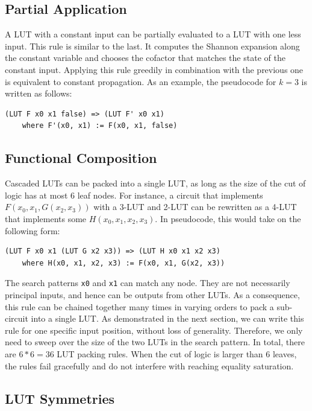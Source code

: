 \subsection{Partial Application}\label{sec:rewrites:application}
A LUT with a constant input can be partially evaluated to a LUT with one less
input. This rule is similar to the last. It computes the Shannon expansion
along the constant variable and chooses the cofactor that matches the state of
the constant input. Applying this rule greedily in combination with the
previous one is equivalent to constant propagation. As an example, the
pseudocode for $k=3$ is written as follows:

\begin{lstlisting}
(LUT F x0 x1 false) => (LUT F' x0 x1)
    where F'(x0, x1) := F(x0, x1, false)
\end{lstlisting}

\subsection{Functional Composition}\label{sec:rewrites:composition}

Cascaded LUTs can be packed into a single LUT, as long as the size of the cut
of logic has at most 6 leaf nodes. For instance, a circuit that implements
$F(x_0, x_1, G(x_2, x_3))$ with a 3-LUT and 2-LUT can be rewritten as a 4-LUT
that implements some $H(x_0, x_1, x_2, x_3)$. In pseudocode, this would take on
the following form:

\begin{lstlisting}
(LUT F x0 x1 (LUT G x2 x3)) => (LUT H x0 x1 x2 x3)
    where H(x0, x1, x2, x3) := F(x0, x1, G(x2, x3))
\end{lstlisting}

The search patterns \texttt{x0} and \texttt{x1} can match any node. They are
not necessarily principal inputs, and hence can be outputs from other LUTs. As
a consequence, this rule can be chained together many times in varying orders
to pack a sub-circuit into a single LUT. As demonstrated in the next section,
we can write this rule for one specific input position, without loss of
generality. Therefore, we only need to sweep over the size of the two LUTs in
the search pattern. In total, there are $6*6 = 36$ LUT packing rules. When the
cut of logic is larger than 6 leaves, the rules fail gracefully and do not
interfere with reaching equality saturation.
\subsection{LUT Symmetries}\label{sec:rewrites:symmetry}

